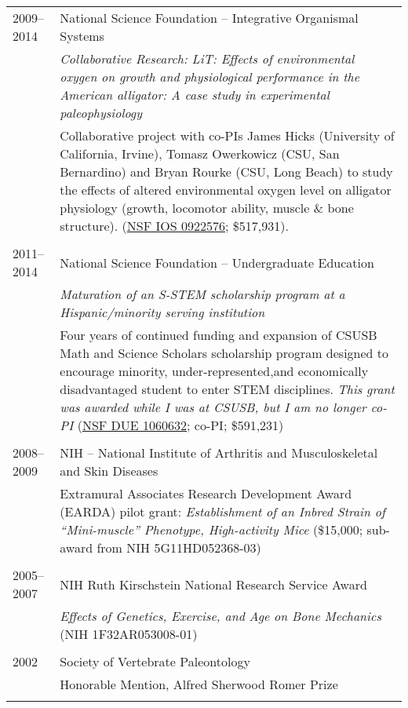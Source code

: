 \begin{longtable}{@{}lX@{}}
    \\
    2009--2014 & National Science Foundation -- Integrative Organismal Systems\\
    & \textit{Collaborative Research: LiT: Effects of environmental oxygen on growth and physiological performance in the American alligator: A case study in experimental paleophysiology}\\[0.5pc]
    & Collaborative project with co-PIs James Hicks (University of California, Irvine), Tomasz Owerkowicz (CSU, San Bernardino) and Bryan Rourke (CSU, Long Beach) to study the effects of altered environmental oxygen level on alligator physiology (growth, locomotor ability, muscle \& bone structure). (\href{http://www.nsf.gov/awardsearch/showAward.do?AwardNumber=0922576}{NSF IOS 0922576}; \$517,931).\\
    \\
    2011--2014 & National Science Foundation -- Undergraduate Education\\
    & \textit{Maturation of an S-STEM scholarship program at a Hispanic/minority serving institution}\\[0.5pc]
    & Four years of continued funding and expansion of CSUSB Math and Science Scholars scholarship program designed to encourage minority, under-represented,and economically disadvantaged student to enter STEM disciplines. \emph{This grant was awarded while I was at CSUSB, but I am no longer co-PI} (\href{http://www.nsf.gov/awardsearch/showAward.do?AwardNumber=1060632}{NSF DUE 1060632}; co-PI; \$591,231)\\
    \\
    2008--2009 & NIH -- National Institute of Arthritis and Musculoskeletal and Skin Diseases\\
    & Extramural Associates Research Development Award (EARDA) pilot grant: \textit{Establishment of an Inbred Strain of ``Mini-muscle'' Phenotype, High-activity Mice} (\$15,000; sub-award from NIH 5G11HD052368-03)\\
    \\
    2005--2007 & NIH Ruth Kirschstein National Research Service Award\\
    & \textit{Effects of Genetics, Exercise, and Age on Bone Mechanics} (NIH 1F32AR053008-01)\\
    \\
    2002 & Society of Vertebrate Paleontology\\
    & Honorable Mention, Alfred Sherwood Romer Prize\\
    \\

\end{longtable}
